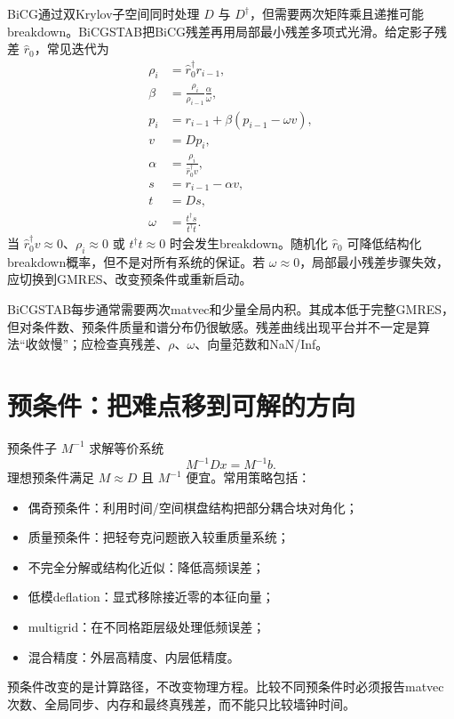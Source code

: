 \documentclass[UTF8,12pt,a4paper,twoside,openany]{ctexbook}
\begin{document}
BiCG通过双Krylov子空间同时处理 \(D\) 与 \(D^\dagger\)，但需要两次矩阵乘且递推可能breakdown。BiCGSTAB把BiCG残差再用局部最小残差多项式光滑。给定影子残差 \(\hat r_0\)，常见迭代为
\begin{align}
  \rho_i&=\hat r_0^\dagger r_{i-1},\\
  \beta&=\frac{\rho_i}{\rho_{i-1}}\frac{\alpha}{\omega},\\
  p_i&=r_{i-1}+\beta(p_{i-1}-\omega v),\\
  v&=Dp_i,\\
  \alpha&=\frac{\rho_i}{\hat r_0^\dagger v},\\
  s&=r_{i-1}-\alpha v,\\
  t&=Ds,\\
  \omega&=\frac{t^\dagger s}{t^\dagger t}.
  \label{eq:bicgstab-kernel}
\end{align}
当 \(\hat r_0^\dagger v\approx0\)、\(\rho_i\approx0\) 或 \(t^\dagger t\approx0\) 时会发生breakdown。随机化 \(\hat r_0\) 可降低结构化breakdown概率，但不是对所有系统的保证。若 \(\omega\approx0\)，局部最小残差步骤失效，应切换到GMRES、改变预条件或重新启动。

BiCGSTAB每步通常需要两次matvec和少量全局内积。其成本低于完整GMRES，但对条件数、预条件质量和谱分布仍很敏感。残差曲线出现平台并不一定是算法“收敛慢”；应检查真残差、\(\rho\)、\(\omega\)、向量范数和NaN/Inf。

\section{预条件：把难点移到可解的方向}

预条件子 \(M^{-1}\) 求解等价系统
\begin{equation}
  M^{-1}Dx=M^{-1}b.
  \label{eq:preconditioned-system}
\end{equation}
理想预条件满足 \(M\approx D\) 且 \(M^{-1}\) 便宜。常用策略包括：
\begin{itemize}
  \item 偶奇预条件：利用时间/空间棋盘结构把部分耦合块对角化；
  \item 质量预条件：把轻夸克问题嵌入较重质量系统；
  \item 不完全分解或结构化近似：降低高频误差；
  \item 低模deflation：显式移除接近零的本征向量；
  \item multigrid：在不同格距层级处理低频误差；
  \item 混合精度：外层高精度、内层低精度。
\end{itemize}
预条件改变的是计算路径，不改变物理方程。比较不同预条件时必须报告matvec次数、全局同步、内存和最终真残差，而不能只比较墙钟时间。
\end{document}

